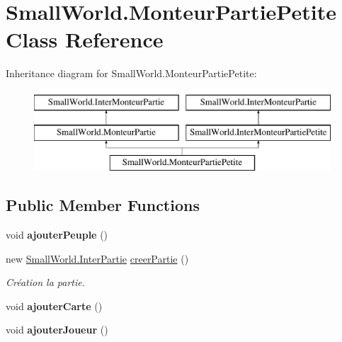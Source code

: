 \hypertarget{class_small_world_1_1_monteur_partie_petite}{\section{Small\-World.\-Monteur\-Partie\-Petite Class Reference}
\label{class_small_world_1_1_monteur_partie_petite}
}
Inheritance diagram for Small\-World.\-Monteur\-Partie\-Petite\-:\begin{figure}[H]
\begin{center}
\leavevmode
\includegraphics[height=3.000000cm]{class_small_world_1_1_monteur_partie_petite}
\end{center}
\end{figure}
\subsection*{Public Member Functions}
\begin{DoxyCompactItemize}
\item 
\hypertarget{class_small_world_1_1_monteur_partie_petite_aa2a1e673524ca4bc7c3a4fece40e5897}{void {\bfseries ajouter\-Peuple} ()}\label{class_small_world_1_1_monteur_partie_petite_aa2a1e673524ca4bc7c3a4fece40e5897}

\item 
\hypertarget{class_small_world_1_1_monteur_partie_petite_ab74f31cd47794ad4488b142f83121b6a}{new \hyperlink{interface_small_world_1_1_inter_partie}{Small\-World.\-Inter\-Partie} \hyperlink{class_small_world_1_1_monteur_partie_petite_ab74f31cd47794ad4488b142f83121b6a}{creer\-Partie} ()}\label{class_small_world_1_1_monteur_partie_petite_ab74f31cd47794ad4488b142f83121b6a}

\begin{DoxyCompactList}\small\item\em Création la partie. \end{DoxyCompactList}\item 
\hypertarget{class_small_world_1_1_monteur_partie_petite_a0d2cb43e852d988eb059d9e2c7189daa}{void {\bfseries ajouter\-Carte} ()}\label{class_small_world_1_1_monteur_partie_petite_a0d2cb43e852d988eb059d9e2c7189daa}

\item 
\hypertarget{class_small_world_1_1_monteur_partie_petite_ad09f7febe49248965e49a20aa59a77d4}{void {\bfseries ajouter\-Joueur} ()}\label{class_small_world_1_1_monteur_partie_petite_ad09f7febe49248965e49a20aa59a77d4}

\end{DoxyCompactItemize}
